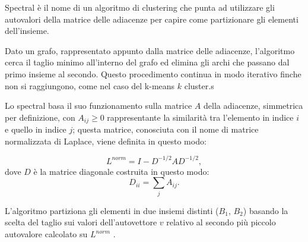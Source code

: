 Spectral è il nome di un algoritmo di clustering che punta ad utilizzare gli autovalori della matrice delle adiacenze per capire come partizionare gli elementi dell'insieme.

Dato un grafo, rappresentato appunto dalla matrice delle adiacenze, l'algoritmo cerca il taglio minimo all'interno del grafo ed elimina gli archi che passano dal primo insieme al secondo. Questo procedimento continua in modo iterativo finche non si raggiungono, come nel caso del k-means $k$ cluster.s

Lo spectral basa il suo funzionamento sulla matrice $A$ della adiacenze, simmetrica per definizione, con $A_{ij}\geq 0$ rappresentante la similarità tra l'elemento in indice $i$ e quello in indice $j$; questa matrice, conosciuta con il nome di matrice normalizzata di Laplace, viene definita in questo modo:

\begin{equation*}
	L^{norm} = I-D^{-1/2} A D^{-1/2},
\end{equation*}
dove $D$ è la matrice diagonale costruita in questo modo:
\begin{equation*}
	D_{ii} = \sum_j A_{ij}.
\end{equation*}

L'algoritmo partiziona gli elementi in due insiemi distinti ($B_1$, $B_2$) basando la scelta del taglio sui valori dell'autovettore $v$ relativo al secondo più piccolo autovalore calcolato su $L^{norm}$ \cite{spectral_algorithm}.